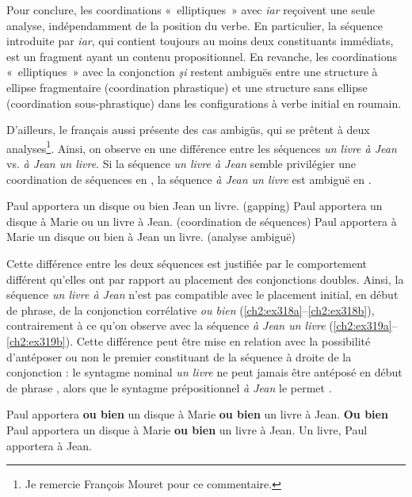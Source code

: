 Pour conclure, les coordinations «~elliptiques~» avec \textit{iar} reçoivent une seule analyse, indépendamment de la position du verbe. En particulier, la séquence introduite par \textit{iar}, qui contient toujours au moins deux constituants immédiats, est un fragment ayant un contenu propositionnel. En revanche, les coordinations «~elliptiques~» avec la conjonction \textit{şi} restent ambiguës entre une structure à ellipse fragmentaire (coordination phrastique) et une structure sans ellipse (coordination sous-phrastique) dans les configurations à verbe initial en roumain.

D’ailleurs, le français aussi présente des cas ambigüs, qui se prêtent à deux analyses\footnote{
 Je remercie François Mouret pour ce commentaire.}. Ainsi, on observe en  une différence entre les séquences \textit{un livre à Jean} vs. \textit{à Jean un livre}. Si la séquence \textit{un livre à Jean} semble privilégier une coordination de séquences en , la séquence \textit{à Jean un livre} est ambiguë en .

\ea \label{ch2:ex317}
\ea Paul apportera un disque ou bien Jean un livre. (gapping) \label{ch2:ex317a}
\ex Paul apportera un disque à Marie ou un livre à Jean. (coordination de séquences) \label{ch2:ex317b}
\ex Paul apportera à Marie un disque ou bien à Jean un livre. (analyse ambiguë) \label{ch2:ex317c}
\z
\z

Cette différence entre les deux séquences est justifiée par le comportement différent qu’elles ont par rapport au placement des conjonctions doubles. Ainsi, la séquence \textit{un livre à Jean} n’est pas compatible avec le placement initial, en début de phrase, de la conjonction corrélative \textit{ou bien} (\ref{ch2:ex318a}--\ref{ch2:ex318b}), contrairement à ce qu’on observe avec la séquence \textit{à Jean un livre} (\ref{ch2:ex319a}--\ref{ch2:ex319b}). Cette différence peut être mise en relation avec la possibilité d’antéposer ou non le premier constituant de la séquence à droite de la conjonction : le syntagme nominal \textit{un livre} ne peut jamais être antéposé en début de phrase , alors que le syntagme prépositionnel \textit{à Jean} le permet .  
\largerpage

\ea \label{ch2:ex318}
\ea Paul apportera \textbf{ou bien} un disque à Marie \textbf{ou bien} un livre à Jean. \label{ch2:ex318a}
\ex *\textbf{Ou bien} Paul apportera un disque à Marie \textbf{ou bien} un livre à Jean. \label{ch2:ex318b}
\ex *Un livre, Paul apportera à Jean. \label{ch2:ex318c}
\z
\z

